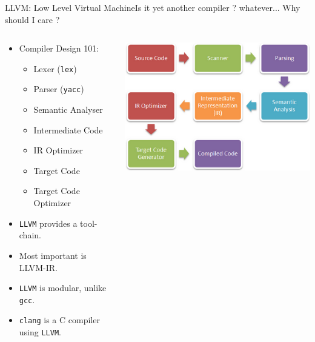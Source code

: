 \documentclass{beamer}
\begin{document}
\begin{frame}{LLVM: Low Level Virtual Machine}{Is it yet another compiler ? whatever... Why should I care ?}
\begin{columns}[T]
\begin{column}{0.5\textwidth}
  \begin{itemize}
  \item {
    Compiler Design 101:
    \begin{itemize}
    \item Lexer (\texttt{lex})
    \item Parser (\texttt{yacc})
    \item Semantic Analyser
    \item Intermediate Code
    \item IR Optimizer
    \item Target Code
    \item Target Code Optimizer
    \end{itemize}
  }
  \item {
    \texttt{LLVM} provides a \alert{tool-chain}.
  }
  \item {
    Most important is \alert{LLVM-IR}.
  }
  \item {
    \texttt{LLVM} is modular, unlike \texttt{gcc}.
    }
    \item \texttt{clang} is a C compiler using \texttt{LLVM}.
  \end{itemize}
  \end{column}
  \begin{column}{0.5\textwidth}
   \includegraphics[width=\textwidth]{CompilerPhases} 
  \end{column}
  \end{columns}
\end{frame}
\end{document}
